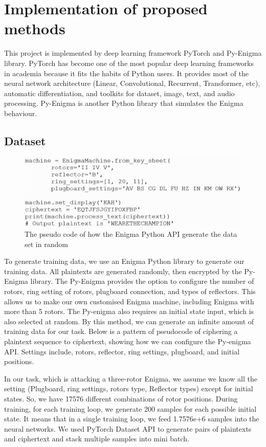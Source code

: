 \chapter{Implementation of proposed methods}

This project is implemented by deep learning framework PyTorch and Py-Enigma library. PyTorch has become one of the most popular deep learning frameworks in academia because it fits the habits of Python users. It provides most of the neural network architecture (Linear, Convolutional, Recurrent, Transformer, etc), automatic differentiation, and toolkits for dataset, image, text, and audio processing. Py-Enigma is another Python library that simulates the Enigma behaviour. 

\section{Dataset}

\begin{figure}
    \centering
    \includegraphics[width=0.8\linewidth]{myReport//figures/Enigma_pseudo.png}
    \caption{The pseudo code of how the Enigma Python API generate the data set in random}
    \label{fig:enter-label}
\end{figure}

To generate training data, we use an Enigma Python library to generate our training data. All plaintexts are generated randomly, then encrypted by the Py-Enigma library. The Py-Enigma provides the option to configure the number of rotors, ring setting of rotors, plugboard connection, and types of reflectors. This allows us to make our own customised Enigma machine, including Enigma with more than 5 rotors. The Py-enigma also requires an initial state input, which is also selected at random. By this method, we can generate an infinite amount of training data for our task. Below is a pattern of pseudocode of ciphering a plaintext sequence to ciphertext, showing how we can configure the Py-enigma API. Settings include, rotors, reflector, ring settings, plugboard, and initial positions.

In our task, which is attacking a three-rotor Enigma, we assume we know all the setting (Plugboard, ring settings, rotors type, Reflector types) except for initial states. So, we have 17576 different combinations of rotor positions. During training, for each training loop, we generate 200 samples for each possible initial state. It means that in a single training loop, we feed 1.7576e+6 samples into the neural networks. We used PyTorch Dataset API to generate pairs of plaintexts and ciphertext and stack multiple samples into mini batch. 

